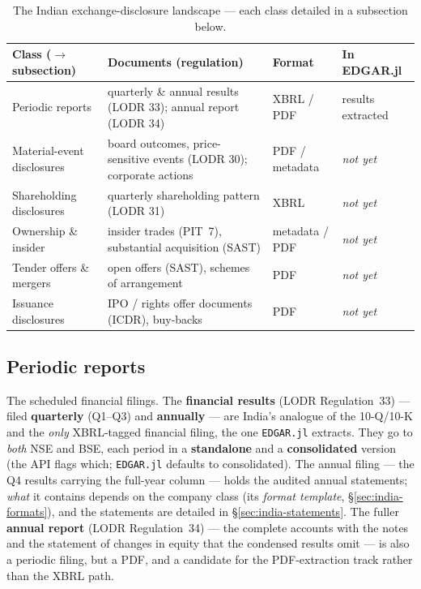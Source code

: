 \documentclass[11pt,a4paper]{report}
\begin{document}
\begin{table}[h]
\centering
\small
\caption{The Indian exchange-disclosure landscape --- each class detailed in a subsection below.}
\label{tab:india-forms}
\begin{tabular}{@{}p{}p{}p{}p{}@{}}
\toprule
\textbf{Class ($\to$ subsection)} & \textbf{Documents (regulation)} & \textbf{Format} & \textbf{In EDGAR.jl} \\
\midrule
Periodic reports & quarterly \& annual results (LODR 33); annual report (LODR 34) & XBRL / PDF & results extracted \\
Material-event disclosures & board outcomes, price-sensitive events (LODR 30); corporate actions & PDF / metadata & \emph{not yet} \\
Shareholding disclosures & quarterly shareholding pattern (LODR 31) & XBRL & \emph{not yet} \\
Ownership \& insider & insider trades (PIT~7), substantial acquisition (SAST) & metadata / PDF & \emph{not yet} \\
Tender offers \& mergers & open offers (SAST), schemes of arrangement & PDF & \emph{not yet} \\
Issuance disclosures & IPO / rights offer documents (ICDR), buy-backs & PDF & \emph{not yet} \\
\bottomrule
\end{tabular}
\end{table}

\subsection{Periodic reports}\label{sec:india-periodic}
The scheduled financial filings. The \textbf{financial results} (LODR Regulation~33) --- filed
\textbf{quarterly} (Q1--Q3) and \textbf{annually} --- are India's analogue of the 10-Q/10-K and the
\emph{only} XBRL-tagged financial filing, the one \texttt{EDGAR.jl} extracts. They go to \emph{both} NSE and
BSE, each period in a \textbf{standalone} and a \textbf{consolidated} version (the API flags which;
\texttt{EDGAR.jl} defaults to consolidated). The annual filing --- the Q4 results carrying the full-year
column --- holds the audited annual statements; \emph{what} it contains depends on the company class (its
\emph{format template}, \S\ref{sec:india-formats}), and the statements are detailed in
\S\ref{sec:india-statements}. The fuller \textbf{annual report} (LODR Regulation~34) --- the complete
accounts with the notes and the statement of changes in equity that the condensed results omit --- is also a
periodic filing, but a PDF, and a candidate for the PDF-extraction track rather than the XBRL path.
\end{document}
